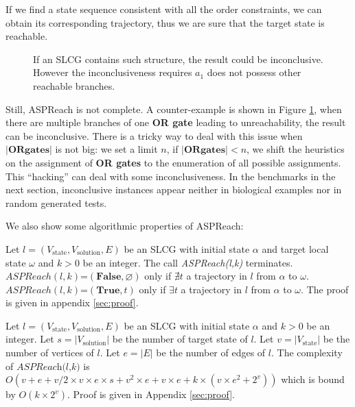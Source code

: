 If we find a state sequence consistent with all the order constraints, we can obtain its corresponding trajectory, thus we are sure that the target state is reachable.

\begin{figure}[ht]
    \centering
    
    \caption[Counterexample of ASPReach]{If an SLCG contains such structure, the result could be inconclusive.
    However the inconclusiveness requires $a_1$ does not possess other reachable branches.}
    \label{fig:lcgInconc}
\end{figure}
Still, ASPReach is not complete.
A counter-example is shown in Figure \ref{fig:lcgInconc}, when there are multiple branches of one \textbf{OR gate} leading to unreachability, the result can be inconclusive.
There is a tricky way to deal with this issue when $\mathbf{|OR gates|}$ is not big: we set a limit $n$, if $\mathbf{|OR gates|}<n$, we shift the heuristics on the assignment of \textbf{OR gates} to the enumeration of all possible assignments.
This ``hacking'' can deal with some inconclusiveness.
In the benchmarks in the next section, inconclusive instances appear neither in biological examples nor in random generated tests.

We also show some algorithmic properties of ASPReach:

\begin{theorem}

    Let $l=(V_{\mathrm{state}}, V_{\mathrm{solution}}, E)$ be an SLCG with initial state $\alpha$ and target local state $\omega$ and $k > 0$ be an integer.
    The call \textit{ASPReach(l,k)} terminates.\\
    $ASPReach(l,k)$=$(\mathbf{False},\varnothing)$ only if $\nexists t$ a trajectory in $l$ from $\alpha$ to $\omega$.\\
    $ASPReach(l,k)$=$(\mathbf{True},t)$ only if $\exists t$ a trajectory in $l$ from $\alpha$ to $\omega$.
    The proof is given in appendix \ref{sec:proof}.
\end{theorem}

\begin{theorem}
    Let $l=(V_{\mathrm{state}}, V_{\mathrm{solution}}, E)$ be an SLCG with initial state $\alpha$ and $k > 0$ be an integer.
    Let $s=|V_{\mathrm{solution}}|$ be the number of target state of $l$.
    Let $v = |V_{\mathrm{state}}|$ be the number of vertices of $l$.
    Let $e=|E|$ be the number of edges of $l$.
    The complexity of $\textit{ASPReach(l,k)}$ is $O(v + e + v/2 \times v \times e \times s + v^{2} \times e + v \times e + k \times (v \times e^{2} + 2^{v}))$ which is bound by $O(k \times 2^{v})$.
    Proof is given in Appendix \ref{sec:proof}.
\end{theorem}
